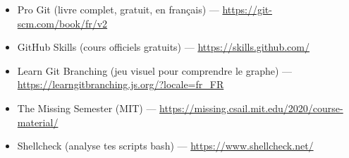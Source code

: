 \begin{ressources}
\begin{itemize}
  \item Pro Git (livre complet, gratuit, en fran\c{c}ais) --- \url{https://git-scm.com/book/fr/v2}
  \item GitHub Skills (cours officiels gratuits) --- \url{https://skills.github.com/}
  \item Learn Git Branching (jeu visuel pour comprendre le graphe) --- \url{https://learngitbranching.js.org/?locale=fr_FR}
  \item The Missing Semester (MIT) --- \url{https://missing.csail.mit.edu/2020/course-material/}
  \item Shellcheck (analyse tes scripts bash) --- \url{https://www.shellcheck.net/}
\end{itemize}
\end{ressources}

